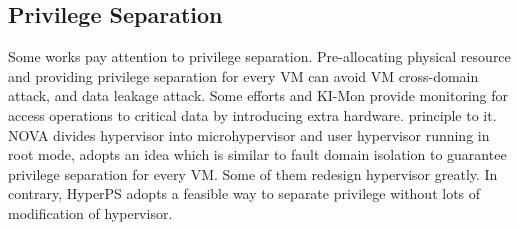 ﻿\documentclass[conference]{IEEEtran}
\begin{document}

\subsection{Privilege Separation}
Some works\cite{nexen,Steinberg2010NOVA,hyperlock,dehy} pay attention to privilege separation. Pre-allocating physical resource and providing privilege separation for every VM can avoid VM cross-domain attack, and data leakage attack. Some efforts\cite{Moon2012Vigilare} and KI-Mon \cite{Lee2013KI} provide monitoring for access operations to critical data by introducing extra hardware.
principle to it.
 NOVA\cite{Steinberg2010NOVA} divides hypervisor into microhypervisor and user hypervisor running in root mode, adopts an idea which is similar to fault domain isolation to guarantee privilege separation for every VM. Some of them redesign hypervisor greatly. In contrary, HyperPS adopts a feasible way to separate privilege without lots of modification of hypervisor. 
\end{document}
